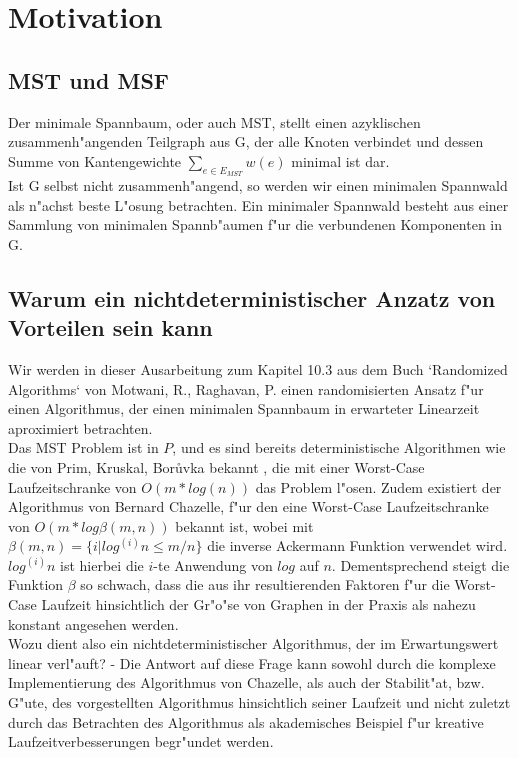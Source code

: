 \section{Motivation}

\subsection{MST und MSF}
Der minimale Spannbaum, oder auch MST, stellt einen azyklischen 
    zusammenh"angenden Teilgraph aus G, der alle Knoten verbindet und
    dessen Summe von Kantengewichte $\sum_{e \in E_{MST}} w(e)$
    minimal ist dar.\\
Ist G selbst nicht zusammenh"angend, so werden wir einen minimalen Spannwald
    als n"achst beste L"osung betrachten.
    Ein minimaler Spannwald besteht aus einer Sammlung von minimalen 
    Spannb"aumen f"ur die verbundenen Komponenten in G.\\

\subsection{Warum ein nichtdeterministischer Anzatz von Vorteilen sein kann}

Wir werden in dieser Ausarbeitung zum Kapitel 10.3 aus dem Buch
    `Randomized Algorithms` von Motwani, R., Raghavan, P.  
    einen
    randomisierten Ansatz f"ur einen Algorithmus, der einen minimalen Spannbaum
    in erwarteter Linearzeit aproximiert betrachten.\\
Das MST Problem ist in $P$, und es sind bereits 
    deterministische Algorithmen wie die von
    Prim, Kruskal, Bor\r uvka bekannt
    , die mit einer Worst-Case Laufzeitschranke 
    von $O(m * log(n))$ das Problem l"osen.
    Zudem existiert der Algorithmus von Bernard Chazelle, f"ur den eine
    Worst-Case Laufzeitschranke von $O(m * log \beta(m,n))$ bekannt ist, wobei
    mit
    $\beta(m,n) = \{i | log^{(i)} n \leq m / n\}$ die inverse Ackermann Funktion
    verwendet wird. 
    $log^{(i)} n$ ist hierbei die $i$-te Anwendung von $log$ auf $n$.
    Dementsprechend steigt die Funktion $\beta$ so schwach, dass die
    aus ihr resultierenden Faktoren f"ur die Worst-Case Laufzeit hinsichtlich
    der Gr"o"se von Graphen in der Praxis als nahezu konstant angesehen werden.\\
Wozu dient also ein nichtdeterministischer Algorithmus, der im Erwartungswert 
    linear verl"auft?
    - Die Antwort auf diese Frage kann sowohl durch die komplexe Implementierung
    des Algorithmus von Chazelle, als auch der Stabilit"at, bzw. G"ute,
    des vorgestellten Algorithmus hinsichtlich seiner Laufzeit
    und nicht zuletzt durch das Betrachten des Algorithmus als akademisches
    Beispiel f"ur kreative Laufzeitverbesserungen begr"undet werden.\\
